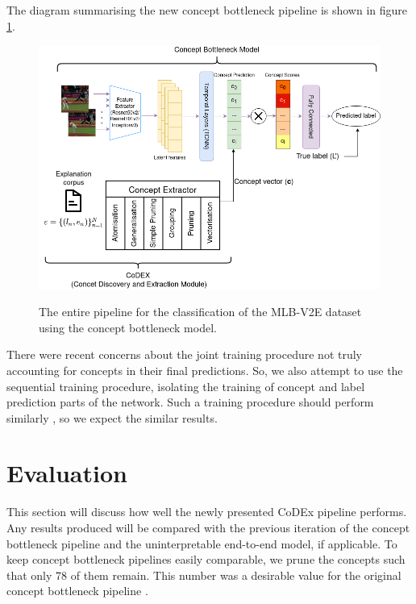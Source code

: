 The diagram summarising the new concept bottleneck pipeline is shown in figure \ref{full-architecture-diagram}.

\begin{figure}[h]
\caption{The entire pipeline for the classification of the MLB-V2E dataset using the concept bottleneck model.} 
\centering
\includegraphics[width=\textwidth]{concept-bottleneck-pipeline/new-concept-bottleneck-pipeline.png}
\label{full-architecture-diagram}
\end{figure}

There were recent concerns about the joint training procedure not truly accounting for concepts in their final predictions. 
So, we also attempt to use the sequential training procedure, isolating the training of concept and label prediction parts of the network.
Such a training procedure should perform similarly \cite{RefWorks:RefID:35-koh2020concept}, so we expect the similar results.

\section{Evaluation}

This section will discuss how well the newly presented CoDEx pipeline performs.
Any results produced will be compared with the previous iteration of the concept bottleneck pipeline and the uninterpretable end-to-end model, if applicable.
To keep concept bottleneck pipelines easily comparable, we prune the concepts such that only 78 of them remain.
This number was a desirable value for the original concept bottleneck pipeline \cite{RefWorks:RefID:16-2021automatic}.


